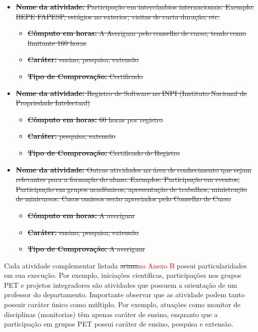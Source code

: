 \begin{itemize}
\item \sout{{\bf Nome da atividade:} Participação em intercâmbios internacionais. Exemplo: BEPE FAPESP, estágios no exterior, visitas de curta duração, etc.}
\begin{itemize}
\item \sout{{\bf Cômputo em horas:} A Averiguar pelo conselho de curso, tendo como limitante 160 horas}
\item \sout{{\bf Caráter:} ensino, pesquisa, extensão}
\item \sout{{\bf Tipo de Comprovação:} Certificado}
\end{itemize}
\end{itemize}

\begin{itemize}
\item \sout{{\bf Nome da atividade:} Registro de Software no INPI (Instituto Nacional de Propriedade Intelectual)}
\begin{itemize}
\item \sout{{\bf Cômputo em horas:} 60 horas por registro}
\item \sout{{\bf Caráter:} pesquisa, extensão}
\item \sout{{\bf Tipo de Comprovação:} Certificado de Registro}
\end{itemize}
\end{itemize}


\begin{itemize}
\item \sout{{\bf Nome da atividade:} Outras atividades na área de conhecimento que sejam relevantes para a formação do aluno. Exemplos: Participação em eventos, Participação em grupos acadêmicos, apresentação de trabalhos, ministração de minicursos. Casos omissos serão apreciados pelo Conselho de Curso}
\begin{itemize}
\item \sout{{\bf Cômputo em horas:} A averiguar}
\item \sout{{\bf Caráter:} ensino, pesquisa, extensão}
\item \sout{{\bf Tipo de Comprovação:} A averiguar}
\end{itemize}
\end{itemize}


Cada atividade complementar listada \sout{acima}\textcolor{red}{no Anexo B} possui particularidades em sua execução. Por exemplo, iniciações científicas, participações nos grupos PET e projetos integradores são atividades que possuem a orientação de um professor do departamento. Importante observar que as atividade podem tanto possuir caráter único como múltiplo. Por exemplo, atuações como monitor de disciplinas (monitorias) têm apenas caráter de ensino, enquanto que a participação em grupos PET possui caráter de ensino, pesquisa e extensão. 

